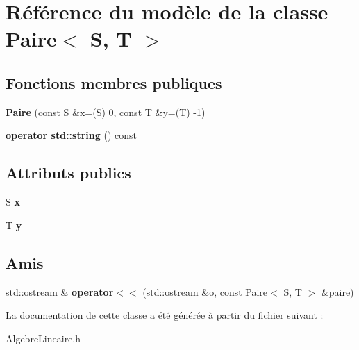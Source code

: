 \hypertarget{class_paire}{}\section{Référence du modèle de la classe Paire$<$ S, T $>$}
\label{class_paire}
\subsection*{Fonctions membres publiques}
\begin{DoxyCompactItemize}
\item 
\mbox{\label{class_paire_a21c9ba52fb6e3a7da4656a13b68a392c}} 
{\bfseries Paire} (const S \&x=(S) 0, const T \&y=(T) -\/1)
\item 
\mbox{\label{class_paire_aa40020123d8bf0f12eb6496a9e398650}} 
{\bfseries operator std\+::string} () const
\end{DoxyCompactItemize}
\subsection*{Attributs publics}
\begin{DoxyCompactItemize}
\item 
\mbox{\label{class_paire_ad56195b97db4252aa83ade8d26f7bac1}} 
S {\bfseries x}
\item 
\mbox{\label{class_paire_aa66b83a8895e0952304155756fb9fab5}} 
T {\bfseries y}
\end{DoxyCompactItemize}
\subsection*{Amis}
\begin{DoxyCompactItemize}
\item 
\mbox{\label{class_paire_a1678b785460f16636eb93498f468eb81}} 
std\+::ostream \& {\bfseries operator$<$$<$} (std\+::ostream \&o, const \mbox{\hyperlink{class_paire}{Paire}}$<$ S, T $>$ \&paire)
\end{DoxyCompactItemize}


La documentation de cette classe a été générée à partir du fichier suivant \+:\begin{DoxyCompactItemize}
\item 
Algebre\+Lineaire.\+h\end{DoxyCompactItemize}
